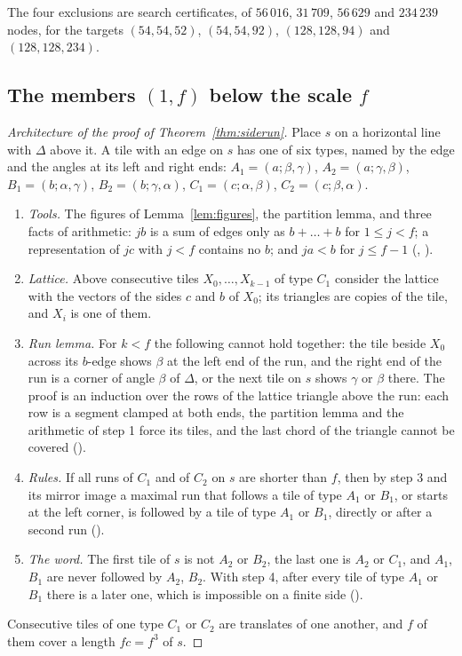 \documentclass[11pt,reqno]{amsart}
\theoremstyle{plain}
\theoremstyle{definition}
\begin{document}
The four exclusions are search certificates, of $56\,016$, $31\,709$, $56\,629$ and $234\,239$ nodes, for
the targets $(54,54,52)$, $(54,54,92)$, $(128,128,94)$ and $(128,128,234)$.

\subsection{The members $(1,f)$ below the scale $f$}\label{sub:below}

\begin{proof}[Architecture of the proof of Theorem~\ref{thm:siderun}]
Place $s$ on a horizontal line with $\Delta$
above it. A tile with an edge on $s$ has one of six types,
named by the edge and the angles at its left and right ends: $A_1=(a;\beta,\gamma)$,
$A_2=(a;\gamma,\beta)$, $B_1=(b;\alpha,\gamma)$, $B_2=(b;\gamma,\alpha)$, $C_1=(c;\alpha,\beta)$,
$C_2=(c;\beta,\alpha)$.
\begin{enumerate}
\item[1.] \emph{Tools.} The figures of Lemma~\ref{lem:figures}, the partition lemma, and three facts of
arithmetic: $jb$ is a sum of edges only as $b+\dots+b$ for $1\le j<f$; a representation of $jc$ with $j<f$
contains no $b$; and $ja<b$ for $j\le f-1$ (, ).
\item[2.] \emph{Lattice.} Above consecutive tiles $X_0,\dots,X_{k-1}$ of type $C_1$ consider the lattice
with the vectors of the sides $c$ and $b$ of $X_0$; its triangles are copies of the tile, and $X_i$ is one
of them.
\item[3.] \emph{Run lemma.} For $k<f$ the following cannot hold together: the tile beside $X_0$ across its
$b$-edge shows $\beta$ at the left end of the run, and the right end of the run is a corner of angle $\beta$
of $\Delta$, or the next tile on $s$ shows $\gamma$ or $\beta$ there. The proof is an induction over the
rows of the lattice triangle above the run: each row is a segment clamped at both ends, the partition lemma
and the arithmetic of step 1 force its tiles, and the last chord of the triangle cannot be covered
().
\item[4.] \emph{Rules.} If all runs of $C_1$ and of $C_2$ on $s$ are shorter than $f$, then by step 3 and
its mirror image a maximal run that follows a tile of type $A_1$ or $B_1$, or starts at the left corner, is
followed by a tile of type $A_1$ or $B_1$, directly or after a second run ().
\item[5.] \emph{The word.} The first tile of $s$ is not $A_2$ or $B_2$, the last one is $A_2$ or $C_1$, and
$A_1$, $B_1$ are never followed by $A_2$, $B_2$. With step 4, after every tile of type $A_1$ or $B_1$ there
is a later one, which is impossible on a finite side ().
\end{enumerate}
Consecutive tiles of one type $C_1$ or $C_2$ are translates of one another, and $f$ of them cover a length
$fc=f^3$ of $s$.
\end{proof}
\end{document}
